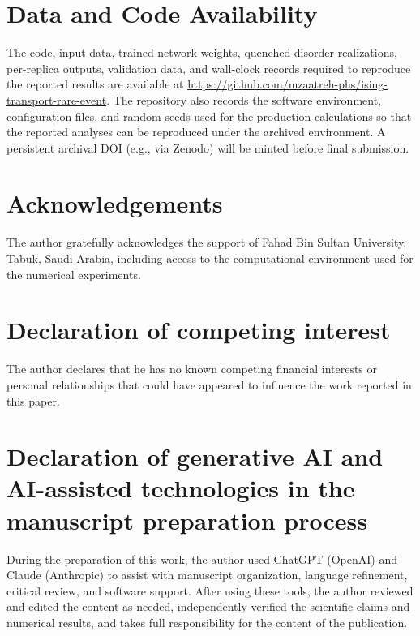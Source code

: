 \documentclass[a4paper,fleqn]{cas-sc}
\begin{document}
\section*{Data and Code Availability}
The code, input data, trained network weights, quenched disorder realizations, per-replica
outputs, validation data, and wall-clock records required to reproduce the reported results are
available at \url{https://github.com/mzaatreh-phs/ising-transport-rare-event}. The repository
also records the software environment, configuration files, and random seeds used for the
production calculations so that the reported analyses can be reproduced under the archived
environment. A persistent archival DOI (e.g., via Zenodo) will be minted before final submission.

\section*{Acknowledgements}
The author gratefully acknowledges the support of Fahad Bin Sultan University, Tabuk, Saudi
Arabia, including access to the computational environment used for the numerical experiments.

\printcredits

\section*{Declaration of competing interest}
The author declares that he has no known competing financial interests or personal
relationships that could have appeared to influence the work reported in this paper.

\section*{Declaration of generative AI and AI-assisted technologies in the manuscript preparation process}
During the preparation of this work, the author used ChatGPT (OpenAI) and Claude (Anthropic)
to assist with manuscript organization, language refinement, critical review, and software
support. After using these tools, the author reviewed and edited the content as needed,
independently verified the scientific claims and numerical results, and takes full
responsibility for the content of the publication.
\end{document}
